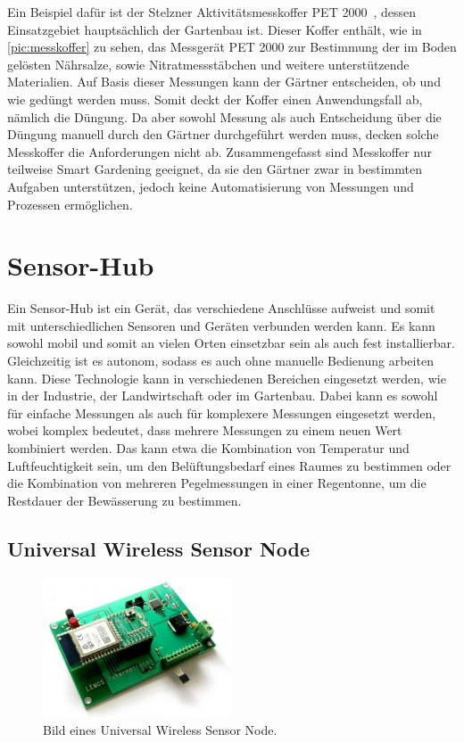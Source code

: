 
Ein Beispiel dafür ist der Stelzner Aktivitätsmesskoffer PET 2000~\cite{Stelzner}, dessen Einsatzgebiet hauptsächlich der Gartenbau ist.
Dieser Koffer enthält, wie in \cref{pic:messkoffer} zu sehen, das Messgerät PET 2000 zur Bestimmung der im Boden gelösten Nährsalze, sowie Nitratmessstäbchen und weitere unterstützende Materialien.
Auf Basis dieser Messungen kann der Gärtner entscheiden, ob und wie gedüngt werden muss.
Somit deckt der Koffer einen Anwendungsfall ab, nämlich die Düngung.
Da aber sowohl Messung als auch Entscheidung über die Düngung manuell durch den Gärtner durchgeführt werden muss, decken solche Messkoffer die Anforderungen nicht ab.
Zusammengefasst sind Messkoffer nur teilweise Smart Gardening geeignet, da sie den Gärtner zwar in bestimmten Aufgaben unterstützen, jedoch keine Automatisierung von Messungen und Prozessen ermöglichen.




\section{Sensor-Hub}
Ein Sensor-Hub ist ein Gerät, das verschiedene Anschlüsse aufweist und somit mit unterschiedlichen Sensoren und Geräten verbunden werden kann.
Es kann sowohl mobil und somit an vielen Orten einsetzbar sein als auch fest installierbar.
Gleichzeitig ist es autonom, sodass es auch ohne manuelle Bedienung arbeiten kann.
Diese Technologie kann in verschiedenen Bereichen eingesetzt werden, wie in der Industrie, der Landwirtschaft oder im Gartenbau.
Dabei kann es sowohl für einfache Messungen als auch für komplexere Messungen eingesetzt werden, wobei komplex bedeutet, dass mehrere Messungen zu einem neuen Wert kombiniert werden.
Das kann etwa die Kombination von Temperatur und Luftfeuchtigkeit sein, um den Belüftungsbedarf eines Raumes zu bestimmen oder die Kombination von mehreren Pegelmessungen in einer Regentonne, um die Restdauer der Bewässerung zu bestimmen.

\subsection{Universal Wireless Sensor Node}

\begin{figure}[!htb]
	\centering
	\includegraphics[width=0.5\textwidth]{images/UniversalWirelessSensorNode.jpg}
	\caption[Bild eines Universal Wireless Sensor Node.]{Bild eines Universal Wireless Sensor Node.\footnotemark}
	\label{pic:universal-sensor-node}
\end{figure}

